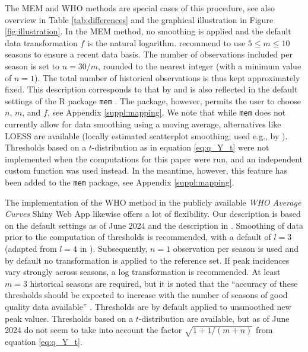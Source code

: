 \documentclass[12pt]{article}
\begin{document}
\noindent The MEM and WHO methods are special cases of this procedure, see also overview in Table \ref{tab:differences} and the graphical illustration in Figure \ref{fig:illustration}. In the MEM method, no smoothing is applied and the default data transformation $f$ is the natural logarithm.  \cite{Vega2015} recommend to use $5 \leq m \leq 10$ seasons to ensure a recent data basis. The number of observations included per season is set to $n = 30/m$, rounded to the nearest integer (with a minimum value of $n = 1$). The total number of historical observations is thus kept approximately fixed. This description corresponds to that by \cite{Vega2015} and is also reflected in the default settings of the R package \texttt{mem} \citep{Lozano2020}. The package, however, permits the user to choose $n$, $m$, and $f$, see Appendix \ref{suppl:mapping}. We note that while \texttt{mem} does not currently allow for data smoothing using a moving average, alternatives like LOESS are available (locally estimated scatterplot smoothing; used e.g., by \citealt{Wang2023}). Thresholds based on a $t$-distribution as in equation \eqref{eq:q_Y_t} were not implemented when the computations for this paper were run, and an independent custom function was used instead. In the meantime, however, this feature has been added to the \texttt{mem} package, see Appendix \ref{suppl:mapping}. %

The implementation of the WHO method in the publicly available \textit{WHO Average Curves} Shiny Web App \citep{WHO2023} likewise offers a lot of flexibility. Our description is based on the default settings as of June 2024 and the description in \cite{WHO2014}. Smoothing of data prior to the computation of thresholds is recommended, with a default of $l = 3$ (adapted from $l = 4$ in \citealt[p68]{WHO2014}). Subsequently, $n = 1$ observation per season is used and by default no transformation is applied to the reference set. If peak incidences vary strongly across seasons, a log transformation is recommended. At least $m = 3$ historical seasons are required, but it is noted that the ``accuracy of these thresholds should be expected to increase with the number of seasons of good quality data available'' \cite[p22]{WHO2023}. Thresholds are by default applied to unsmoothed new peak values. Thresholds based on a $t$-distribution are available, but as of June 2024 do not seem to take into account the factor $\sqrt{1 + 1/(m + n)}$ from equation \eqref{eq:q_Y_t}.
\end{document}
